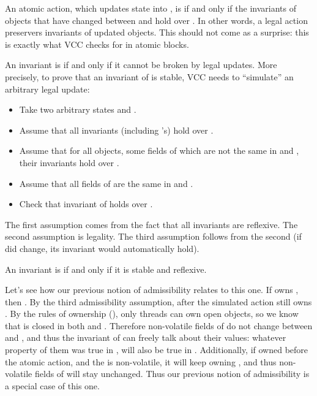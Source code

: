 An atomic action, which updates state  into , is  if and only if the invariants of
objects that have changed between  and  hold over .
In other words, a legal action preservers invariants of updated objects.
This should not come as a surprise: this is exactly what VCC checks
for in atomic blocks.

An invariant is  if and only if it cannot be broken by legal updates.
More precisely, to prove that an invariant of  is stable,
VCC needs to ``simulate'' an arbitrary legal update:
\begin{itemize}
\item Take two arbitrary states  and .
\item Assume that all invariants (including 's) hold over .
\item Assume that for all objects, some fields of which are not the same in  and ,
their invariants hold over .
\item Assume that all fields of  are the same in  and .
\item Check that invariant of  holds over .
\end{itemize}
The first assumption comes from the fact that all invariants are reflexive.
The second assumption is legality.
The third assumption follows from the second (if  did change, its invariant would
automatically hold).

An invariant is  if and only if it is stable and reflexive.

Let's see how our previous notion of admissibility relates to this one.
If  owns , then .
By the third admissibility assumption, after the simulated action  still owns .
By the rules of ownership (), only threads can own
open objects, so we know that  is closed in both 
and .
Therefore non-volatile fields of  do not change between  and ,
and thus the invariant of  can freely talk about their values:
whatever property of them was true in , will also be true in .
Additionally, if  owned  before the atomic action, and the  is non-volatile,
it will keep owning , and thus non-volatile fields of 
will stay unchanged.
Thus our previous notion of admissibility is a special case of this one.

